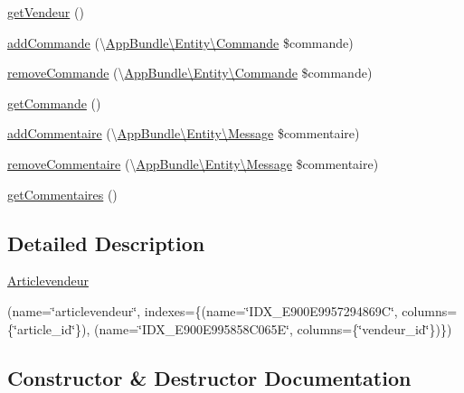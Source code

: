 \begin{DoxyCompactItemize}
\item 
\hyperlink{class_app_bundle_1_1_entity_1_1_articlevendeur_ae5ad9607b100d9b00e73bf694486fbb2}{get\+Vendeur} ()
\item 
\hyperlink{class_app_bundle_1_1_entity_1_1_articlevendeur_a75bcaaf28b2db7788b35c2455b42b538}{add\+Commande} (\textbackslash{}\hyperlink{class_app_bundle_1_1_entity_1_1_commande}{App\+Bundle\textbackslash{}\+Entity\textbackslash{}\+Commande} \$commande)
\item 
\hyperlink{class_app_bundle_1_1_entity_1_1_articlevendeur_a8b0b8ca20c3b7423bd6b456fe8e0df7d}{remove\+Commande} (\textbackslash{}\hyperlink{class_app_bundle_1_1_entity_1_1_commande}{App\+Bundle\textbackslash{}\+Entity\textbackslash{}\+Commande} \$commande)
\item 
\hyperlink{class_app_bundle_1_1_entity_1_1_articlevendeur_ac8a6ebc92d6179d9d951692b63c3fb40}{get\+Commande} ()
\item 
\hyperlink{class_app_bundle_1_1_entity_1_1_articlevendeur_afb097e7bb2c8def7f442edb14a14c324}{add\+Commentaire} (\textbackslash{}\hyperlink{class_app_bundle_1_1_entity_1_1_message}{App\+Bundle\textbackslash{}\+Entity\textbackslash{}\+Message} \$commentaire)
\item 
\hyperlink{class_app_bundle_1_1_entity_1_1_articlevendeur_a6fa8bff148331a79803a74a74f706e4e}{remove\+Commentaire} (\textbackslash{}\hyperlink{class_app_bundle_1_1_entity_1_1_message}{App\+Bundle\textbackslash{}\+Entity\textbackslash{}\+Message} \$commentaire)
\item 
\hyperlink{class_app_bundle_1_1_entity_1_1_articlevendeur_afa6d96c945b2bf81ed7941fe80a4b91d}{get\+Commentaires} ()
\end{DoxyCompactItemize}


\subsection{Detailed Description}
\hyperlink{class_app_bundle_1_1_entity_1_1_articlevendeur}{Articlevendeur}

(name=\char`\"{}articlevendeur\char`\"{}, indexes=\{(name=\char`\"{}\+I\+D\+X\+\_\+\+E900\+E9957294869\+C\char`\"{}, columns=\{\char`\"{}article\+\_\+id\char`\"{}\}), (name=\char`\"{}\+I\+D\+X\+\_\+\+E900\+E995858\+C065\+E\char`\"{}, columns=\{\char`\"{}vendeur\+\_\+id\char`\"{}\})\})  

\subsection{Constructor \& Destructor Documentation}
\mbox{\label{class_app_bundle_1_1_entity_1_1_articlevendeur_a78b329368f8e3e55f27261662cc57c15}} 
